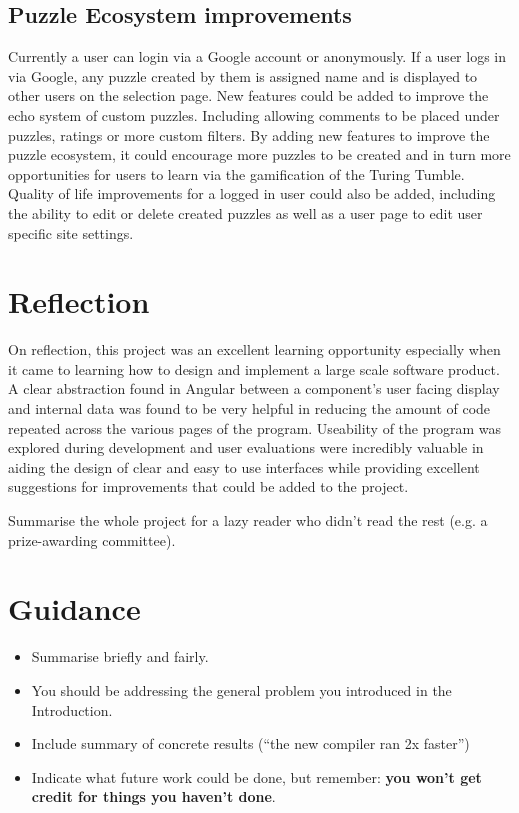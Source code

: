\documentclass{l4proj}
\begin{document}
\subsection{Puzzle Ecosystem improvements}
Currently a user can login via a Google account or anonymously. If a user logs in via Google, any puzzle created by them is assigned name and is displayed to other users on the selection page. New features could be added to improve the echo system of custom puzzles. Including allowing comments to be placed under puzzles, ratings or more custom filters. By adding new features to improve the puzzle ecosystem, it could encourage more puzzles to be created and in turn more opportunities for users to learn via the gamification of the Turing Tumble. Quality of life improvements for a logged in user could also be added, including the ability to edit or delete created puzzles as well as a user page to edit user specific site settings.

\section{Reflection}
On reflection, this project was an excellent learning opportunity especially when it came to learning how to design and implement a large scale software product. A clear abstraction found in Angular between a component's user facing display and internal data was found to be very helpful in reducing the amount of code repeated across the various pages of the program. Useability of the program was explored during development and user evaluations were incredibly valuable in aiding the design of clear and easy to use interfaces while providing excellent suggestions for improvements that could be added to the project.

Summarise the whole project for a lazy reader who didn't read the rest (e.g. a prize-awarding committee).
\section{Guidance}
\begin{itemize}
    \item
        Summarise briefly and fairly.
    \item
        You should be addressing the general problem you introduced in the
        Introduction.        
    \item
        Include summary of concrete results (``the new compiler ran 2x
        faster'')
    \item
        Indicate what future work could be done, but remember: \textbf{you
        won't get credit for things you haven't done}.
\end{itemize}
\end{document}
